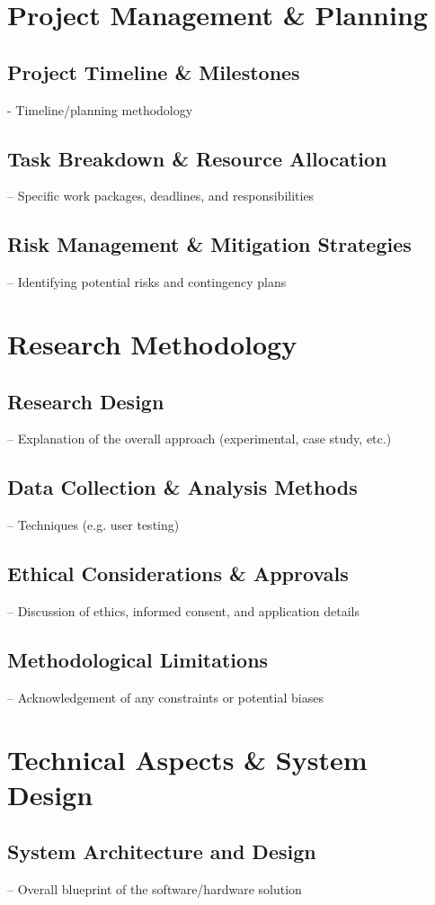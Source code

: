 \section{Project Management \& Planning}
\subsection{Project Timeline \& Milestones}
- Timeline/planning methodology
\subsection{Task Breakdown \& Resource Allocation}
– Specific work packages, deadlines, and responsibilities
\subsection{Risk Management \& Mitigation Strategies}
– Identifying potential risks and contingency plans
\section{Research Methodology}
\subsection{Research Design}
– Explanation of the overall approach (experimental, case study, etc.)
\subsection{Data Collection \& Analysis Methods}
– Techniques (e.g. user testing)
\subsection{Ethical Considerations \& Approvals}
– Discussion of ethics, informed consent, and application details
\subsection{Methodological Limitations}
– Acknowledgement of any constraints or potential biases
\section{Technical Aspects \& System Design}
\subsection{System Architecture and Design}
– Overall blueprint of the software/hardware solution
